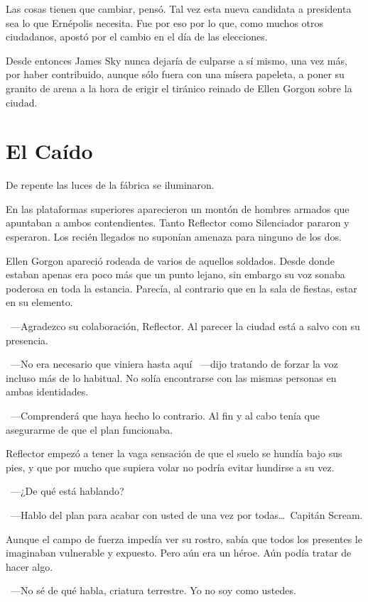 Las cosas tienen que cambiar, pensó. Tal vez esta nueva candidata a presidenta sea lo que Ernépolis necesita. Fue por eso por lo que, como muchos otros ciudadanos, apostó por el cambio en el día de las elecciones.

Desde entonces James Sky nunca dejaría de culparse a sí mismo, una vez más, por haber contribuido, aunque sólo fuera con una mísera papeleta, a poner su granito de arena a la hora de erigir el tiránico reinado de Ellen Gorgon sobre la ciudad.

\section*{El Caído}

De repente las luces de la fábrica se iluminaron.

En las plataformas superiores aparecieron un montón de hombres armados que apuntaban a ambos contendientes. Tanto Reflector como Silenciador pararon y esperaron. Los recién llegados no suponían amenaza para ninguno de los dos.

Ellen Gorgon apareció rodeada de varios de aquellos soldados. Desde donde estaban apenas era poco más que un punto lejano, sin embargo su voz sonaba poderosa en toda la estancia. Parecía, al contrario que en la sala de fiestas, estar en su elemento.

~---Agradezco su colaboración, Reflector. Al parecer la ciudad está a salvo con su presencia.

~---No era necesario que viniera hasta aquí ~---dijo tratando de forzar la voz incluso más de lo habitual. No solía encontrarse con las mismas personas en ambas identidades.

~---Comprenderá que haya hecho lo contrario. Al fin y al cabo tenía que asegurarme de que el plan funcionaba.

Reflector empezó a tener la vaga sensación de que el suelo se hundía bajo sus pies, y que por mucho que supiera volar no podría evitar hundirse a su vez.

~---¿De qué está hablando?

~---Hablo del plan para acabar con usted de una vez por todas\dots\ Capitán Scream.

Aunque el campo de fuerza impedía ver su rostro, sabía que todos los presentes le imaginaban vulnerable y expuesto. Pero aún era un héroe. Aún podía tratar de hacer algo.

~---No sé de qué habla, criatura terrestre. Yo no soy como ustedes.

